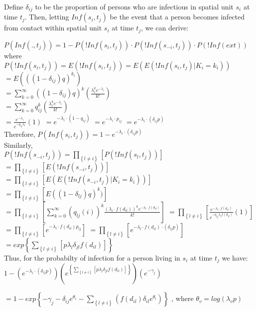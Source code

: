 \documentclass[12pt]{article}
\newcommand \mbreak {\\ \vspace{0.1in}}
\begin{document}
Define $\delta_{ij}$ to be the proportion of persons who are infectious in spatial unit $s_i$ 
at time $t_j$. Then, letting $Inf(s_i, t_j)$ be the event that a person becomes 
infected from contact within spatial unit $s_i$ at time $t_j$, we can derive:

\begin{center}

    $P(Inf(.,t_j)) = 1 - P(!Inf(s_i, t_j)) \cdot  P(!Inf(s_{-i}, t_j)) \cdot P(!Inf(ext))$ \mbreak
    where \mbreak 
    $P(!Inf(s_i, t_j)) = E(!Inf(s_i, t_j)) = E(E(!Inf(s_i, t_j)|K_i=k_i))$  \mbreak 
    $\displaystyle =E(((1-\delta_{ij})q)^{k_i})$  \mbreak 
    $\displaystyle = \sum_{k=0}^{\infty} ((1-\delta_{ij})q)^k(\frac{\lambda_i^ke^{-\lambda_i}}{k!})$\mbreak
    $\displaystyle =  \sum_{k=0}^{\infty} q_{ij}^k (\frac{\lambda_i^ke^{-\lambda_i}}{k!})$\mbreak
    $\displaystyle = \frac{e^{-\lambda_i}}{e^{-q_{ij}\lambda_i}}(1)$
    $ = e^{-\lambda_i\cdot(1-q_{ij})} $
    $ = e^{-\lambda_i \cdot p_{ij}} $
    $ = e^{-\lambda_i \cdot (\delta_{ij}p)}$ \mbreak
    Therefore,  $P(Inf(s_i, t_j)) = 1 - e^{-\lambda_i \cdot (\delta_{ij}p)} $ \mbreak
    Similarly,\mbreak
    $\displaystyle P(!Inf(s_{-i}, t_j)) = \prod_{\left\{l \ne i\right\}}\left[P(!Inf(s_l, t_j)) \right]$ \mbreak
    $\displaystyle = \prod_{\left\{ l \ne i \right\}}\left[E(!Inf(s_{-i}, t_j))\right] $
    $\displaystyle = \prod_{\left\{ l \ne i \right\}}\left[E(E(!Inf(s_{-i}, t_j)|K_i=k_i)) \right]$  \mbreak 
    $\displaystyle = \prod_{\left\{ l \ne i \right\}}\left[ E((1-\delta_{lj})q)^k )  \right]$\mbreak 
    $\displaystyle = \prod_{\left\{ l \ne i \right\}}\left[ \sum_{k=0}^{\infty}(q_{lj}(i))^k\frac{(\lambda_l\cdot f(d_{il}))^ke^{-\lambda_l \cdot f(d_{il})}}{k!}    \right] $
    $\displaystyle = \prod_{\left\{ l \ne i \right\}}\left[ \frac{e^{-\lambda_l \cdot f(d_{il})}}{e^{-q_{lj}\lambda_l f(d_{il})}}(1)  \right]$\mbreak
    $\displaystyle = \prod_{\left\{ l \ne i \right\}}\left[ e^{-\lambda_l \cdot f(d_{il}) p_{lj}}  \right]$
    $\displaystyle = \prod_{\left\{ l \ne i \right\}}\left[ e^{-\lambda_l\cdot f(d_{il}) \cdot (\delta_{lj}p) }  \right]$\mbreak
    $\displaystyle = exp\left\{\sum_{\left\{ l \ne i \right\}}\left[p\lambda_l\delta_{jl}f(d_{il})   \right] \right\}$ \mbreak
    Thus, for the probabilty of infection for a person living in $s_i$ at time $t_j$ we have: \mbreak 
    $\displaystyle 1-\left(e^{-\lambda_i \cdot (\delta_{ij}p)}\right) \left( 
        e^{\left\{\sum_{\left\{ l \ne i \right\}}\left[p\lambda_l\delta_{jl}f(d_{il})   \right] \right\}}\right)\left(e^{-\gamma_j}\right)
     $ \mbreak 

    $\displaystyle = 1- exp\left\{-\gamma_j-\delta_{ij}e^{\theta_{i}} - \sum_{\left\{ l \ne i  \right\}}
        (f(d_{il})\delta_{il}e^{\theta_{l}})   \right\}$ 
    , where $\theta_{v} = log(\lambda_{v}p)$
 
\end{center}
\end{document}
